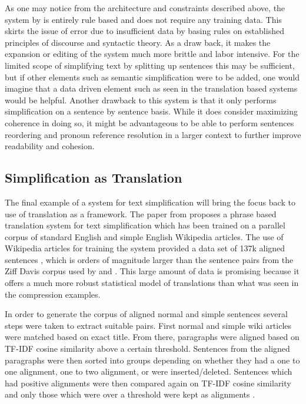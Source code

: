 {As one may notice from the architecture and constraints described above, the system by \citet{Siddharthan2006} is entirely rule based and does not require any training data.  This skirts the issue of error due to insufficient data by basing rules on established principles of discourse and syntactic theory.  As a draw back, it makes the expansion or editing of the system much more brittle and labor intensive.  For the limited scope of simplifying text by splitting up sentences this may be sufficient, but if other elements such as semantic simplification were to be added, one would imagine that a data driven element such as seen in the translation based systems would be helpful.  Another drawback to this system is that it only performs simplification on a sentence by sentence basis.  While it does consider maximizing coherence in doing so, it might be advantageous to be able to perform sentences reordering and pronoun reference resolution in a larger context to further improve readability and cohesion.} 


\subsection{Simplification as Translation}

{The final example of a system for text simplification will bring the focus back to use of translation as a framework.  The paper from   \citet{coster-kauchak:2011:T2TW-2011} proposes a phrase based translation system for text simplification which has been trained on a parallel corpus of standard English and simple English Wikipedia articles.  The use of Wikipedia articles for training the system provided a data set of 137k aligned sentences \citep{coster-kauchak:2011:T2TW-2011}, which is orders of magnitude larger than the sentence pairs from the Ziff Davis corpus used by \citet{knight2000statistics} and \citet{galley2007lexicalized}.  This large amount of data is promising because it offers a much more robust statistical model of translations than what was seen in the compression examples.}

{In order to generate the corpus of aligned normal and simple sentences several steps were taken to extract suitable pairs.  First normal and simple wiki articles were matched based on exact title.  From there, paragraphs were aligned based on TF-IDF cosine similarity above a certain threshold.  Sentences from the aligned paragraphs were then sorted into groups depending on whether they had a one to one alignment,  one to two alignment, or were inserted/deleted.  Sentences which had positive alignments were then compared again on TF-IDF cosine similarity and only those which were over a threshold were kept as alignments\citep{coster-kauchak:2011:T2TW-2011} .}  

